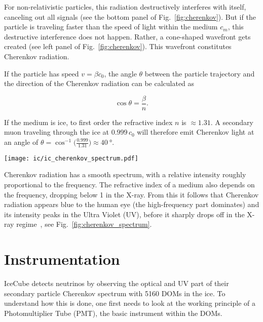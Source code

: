 For non-relativistic particles, this radiation destructively interferes with itself, canceling out all signals (see the bottom panel of Fig.~\ref{fig:cherenkov}). But if the particle is traveling faster than the speed of light within the medium $c_m$, this destructive interference does not happen. Rather, a cone-shaped wavefront gets created (see left panel of Fig.~\ref{fig:cherenkov}). This wavefront constitutes Cherenkov radiation.

If the particle has speed $v=\beta c_0$, the angle $\theta$ between the particle trajectory and the direction of the Cherenkov radiation can be calculated as~

\begin{equation}
    \cos{\theta} = \frac{\beta}{n}.
\end{equation}

If the medium is ice, to first order the refractive index $n$ is $\approx1.31$. A secondary muon traveling through the ice at $0.999\,c_0$ will therefore emit Cherenkov light at an angle of $\theta = \cos^{-1}{\big(\frac{0.999}{1.31}\big)} \approx \SI{40}{\degree}$.
\begin{marginfigure}
    \texttt{[image: ic/ic\_cherenkov\_spectrum.pdf]}
    \caption[Cherenkov spectrum]{Cherenkov spectrum for a particle with $v=0.8 \,c_0$ in water. The intensity peaks around $\SI{4e15}{\Hz}$, corresponding to a wavelength of \SI{75}{\nm}, lying at the high-frequency end of the UV spectrum. Adapted from~\cite{Fulop1992}.}
\end{marginfigure}
Cherenkov radiation has a smooth spectrum, with a relative intensity roughly proportional to the frequency. The refractive index of a medium also depends on the frequency, dropping below 1 in the X-ray. From this it follows that Cherenkov radiation appears blue to the human eye (the high-frequency part dominates) and its intensity peaks in the Ultra Violet (UV), before it sharply drops off in the X-ray regime~, see Fig.~\ref{fig:cherenkov_spectrum}.

\section{Instrumentation}

IceCube detects neutrinos by observing the optical and UV part of their secondary particle Cherenkov spectrum with 5160 DOMs in the ice. To understand how this is done, one first needs to look at the working principle of a Photomultiplier Tube (PMT), the basic instrument within the DOMs.

